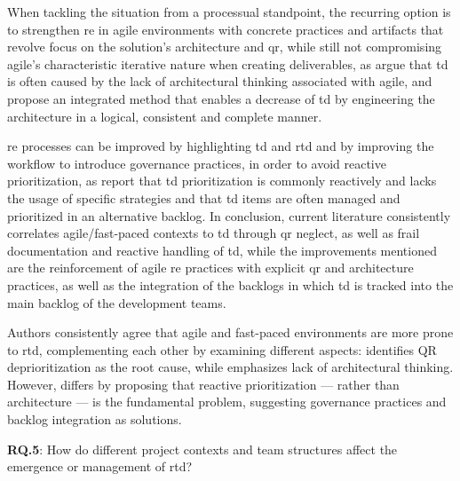 \documentclass[12pt,reqno, twoside]{amsbook}
\theoremstyle{plain}
\numberwithin{equation}{chapter}
\numberwithin{section}{chapter}
\begin{document}
When tackling the situation from a processual standpoint, the recurring option is to strengthen \gls{re} in agile 
environments with concrete practices and artifacts that revolve focus on the solution's architecture and 
\gls{qr}, while still not compromising agile's characteristic iterative nature when creating deliverables,
as \textcite{Snoeck2022} argue that \gls{td} is often caused by the lack of architectural thinking associated with 
agile, and propose an integrated method that enables a decrease of \gls{td} by engineering the architecture in a 
logical, consistent and complete manner.

\gls{re} processes can be improved by highlighting \gls{td} and \gls{rtd} and by improving the workflow to introduce governance practices, 
in order to avoid reactive prioritization, as \textcite{Besker2019} report that \gls{td} prioritization is commonly 
reactively and lacks the usage of specific strategies and that \gls{td} items are often managed and 
prioritized in an alternative backlog.
In conclusion, current literature consistently correlates agile/fast-paced contexts to \gls{td} through \gls{qr} 
neglect, as well as frail documentation and reactive handling of \gls{td}, while the improvements mentioned are the 
reinforcement of agile \gls{re} practices with explicit \gls{qr} and architecture practices, as well as the 
integration of the backlogs in which \gls{td} is tracked into the main backlog of the development teams.

Authors consistently agree that agile and fast-paced environments are more prone to \gls{rtd}, complementing each other by examining different aspects: \textcite{Behutiye2019} identifies QR deprioritization as the root cause, while \textcite{Snoeck2022} emphasizes lack of architectural thinking. However, \textcite{Besker2019} differs by proposing that reactive prioritization — rather than architecture — is the fundamental problem, suggesting governance practices and backlog integration as solutions.

\hspace*{\linewidth}\par
\noindent\textbf{RQ.5}: 
How do different project contexts and team structures affect the emergence or management of \gls{rtd}?\par
\end{document}
